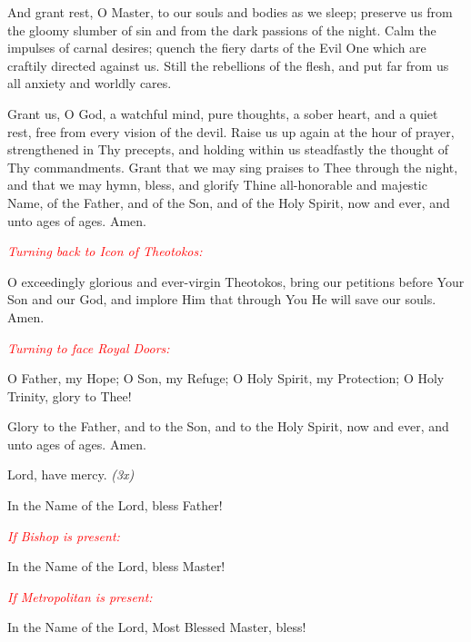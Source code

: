 \begin{hang}
\noindent\makebox[\indt][l]{}And grant rest, O Master, to our souls and bodies 
as we sleep; preserve us from the gloomy slumber of sin and from the dark 
passions of the night. Calm the impulses of carnal desires; quench the fiery 
darts of the Evil One which are craftily directed against us.  Still the 
rebellions of the flesh, and put far from us all anxiety and worldly cares.

Grant us, O God, a watchful mind, pure thoughts, a sober heart, and a quiet 
rest, free from every vision of the devil.  Raise us up again at the hour of 
prayer, strengthened in Thy precepts, and holding within us steadfastly the 
thought of Thy commandments.  Grant that we may sing praises to Thee through 
the night, and that we may hymn, bless, and glorify Thine all-honorable and 
majestic Name, of the Father, and of the Son, and of the Holy Spirit, now and 
ever, and unto ages of ages.  Amen.

\end{hang}

\textcolor{red}{\textit{Turning back to Icon of Theotokos:}}

\begin{hang}
\noindent\makebox[\indt][l]{}O exceedingly glorious and ever-virgin Theotokos, 
bring our petitions before Your Son and our God, and implore Him that through 
You He will save our souls.  Amen.

\end{hang}

\textcolor{red}{\textit{Turning to face Royal Doors:}}

\begin{hang}
\noindent\makebox[\indt][l]{}O Father, my Hope;  O Son, my Refuge;  O Holy 
Spirit, my Protection;  O Holy Trinity, glory to Thee!

\end{hang}

\begin{hang}
\noindent{}Glory to the Father, and to the 
Son, and to the Holy Spirit, now and ever, and unto ages of ages.  Amen.

Lord, have mercy. \textit{(3x)}

In the Name of the Lord, bless Father!

\textcolor{red}{\textit{If Bishop is present:}}

In the Name of the Lord, bless Master!

\textcolor{red}{\textit{If Metropolitan is present:}}

In the Name of the Lord, Most Blessed Master, bless!

\end{hang}

